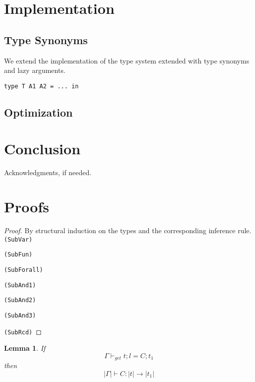 \documentclass[preprint]{sigplanconf}
\newtheorem{lemma}{Lemma}
\begin{document}




\section{Implementation}

\subsection{Type Synonyms}

We extend the implementation of the type system extended with type synonyms and
lazy arguments.

\begin{lstlisting}
type T A1 A2 = ... in
\end{lstlisting}

\subsection{Optimization}



\section{Conclusion}


Acknowledgments, if needed.

\appendix

\section{Proofs}

\begin{proof}
By structural induction on the types and the corresponding inference rule. \\

\texttt{(SubVar)}

\texttt{(SubFun)}

\texttt{(SubForall)}

\texttt{(SubAnd1)}

\texttt{(SubAnd2)}

\texttt{(SubAnd3)}

\texttt{(SubRcd)}

\end{proof}

\begin{lemma}
  If $$ \Gamma \vdash_{get} t ; l = C ; t_1 $$
  then $$ |\Gamma| \vdash C : |t| \to |t_1| $$
\end{lemma}
\end{document}
